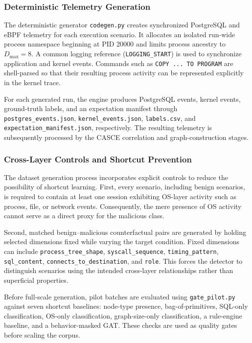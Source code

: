 \documentclass[conference]{IEEEtran}
\begin{document}
\subsubsection{Deterministic Telemetry Generation}

The deterministic generator \texttt{codegen.py} creates synchronized
PostgreSQL and eBPF telemetry for each execution scenario. It allocates an
isolated run-wide process namespace beginning at PID 20000 and limits
process ancestry to $D_{\max}=8$. A common logging reference
(\texttt{LOGGING\_START}) is used to synchronize application and kernel
events. Commands such as \texttt{COPY ... TO PROGRAM} are shell-parsed so
that their resulting process activity can be represented explicitly in the
kernel trace.

For each generated run, the engine produces PostgreSQL events,
kernel events, ground-truth labels, and an expectation manifest through
\texttt{postgres\_events.json}, \texttt{kernel\_events.json},
\texttt{labels.csv}, and \texttt{expectation\_manifest.json}, respectively.
The resulting telemetry is subsequently processed by the CASCE correlation
and graph-construction stages.

\subsubsection{Cross-Layer Controls and Shortcut Prevention}

The dataset generation process incorporates explicit controls to reduce
the possibility of shortcut learning. First, every scenario, including
benign scenarios, is required to contain at least one session exhibiting
OS-layer activity such as process, file, or network events. Consequently,
the mere presence of OS activity cannot serve as a direct proxy for the
malicious class.

Second, matched benign--malicious counterfactual pairs are generated by
holding selected dimensions fixed while varying the target condition.
Fixed dimensions can include \texttt{process\_tree\_shape},
\texttt{syscall\_sequence}, \texttt{timing\_pattern},
\texttt{sql\_content}, \texttt{connects\_to\_destination}, and
\texttt{role}. This forces the detector to distinguish scenarios using
the intended cross-layer relationships rather than superficial properties.

Before full-scale generation, pilot batches are evaluated using
\texttt{gate\_pilot.py} against seven shortcut baselines: node-type
presence, bag-of-primitives, SQL-only classification, OS-only
classification, graph-size-only classification, a rule-engine baseline,
and a behavior-masked GAT. These checks are used as quality gates before
scaling the corpus.
\end{document}
